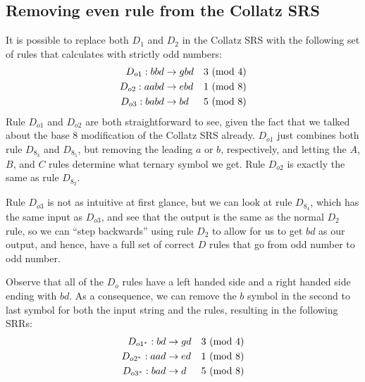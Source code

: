 \subsection{Removing even rule from the Collatz SRS}\label{subsubsec:evenruleremove}
It is possible to replace both $D_1$ and $D_2$ in the Collatz SRS with the following set of rules that calculates with strictly odd numbers:
\begin{align*}
    D_{o1}: bbd &\rightarrow gbd &\text{$3\ (\mathrm{mod}\ 4)$}\\
    D_{o2}: aabd &\rightarrow ebd &\text{$1\ (\mathrm{mod}\ 8)$}\\
    D_{o3}: babd &\rightarrow bd &\text{$5\ (\mathrm{mod}\ 8)$}
\end{align*}
Rule $D_{o1}$ and $D_{o2}$ are both straightforward to see, given the fact that we talked about the base 8 modification of the Collatz SRS already. $D_{o1}$ just combines both rule $D_{8_3}$ and $D_{8_5}$, but removing the leading $a$ or $b$, respectively, and letting the $A$, $B$, and $C$ rules determine what ternary symbol we get. Rule $D_{o2}$ is exactly the same as rule $D_{8_2}$.\par
Rule $D_{o3}$ is not as intuitive at first glance, but we can look at rule $D_{8_4}$, which has the same input as $D_{o3}$, and see that the output is the same as the normal $D_2$ rule, so we can ``step backwards'' using rule $D_2$ to allow for us to get $bd$ as our output, and hence, have a full set of correct $D$ rules that go from odd number to odd number.\par
Observe that all of the $D_o$ rules have a left handed side and a right handed side ending with $bd$. As a consequence, we can remove the $b$ symbol in the second to last symbol for both the input string and the rules, resulting in the following SRRs:
\begin{align*}
    D_{o1^*}: bd &\rightarrow gd &\text{$3\ (\mathrm{mod}\ 4)$}\\
    D_{o2^*}: aad &\rightarrow ed &\text{$1\ (\mathrm{mod}\ 8)$}\\
    D_{o3^*}: bad &\rightarrow d &\text{$5\ (\mathrm{mod}\ 8)$}
\end{align*}
